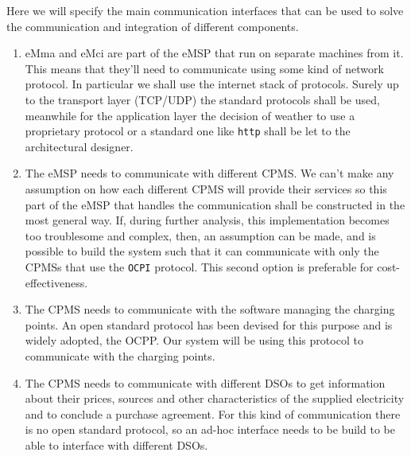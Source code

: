 Here we will specify the main communication interfaces that can be used to solve the communication and integration of different components.

\begin{enumerate}
    \item eMma and eMci are part of the eMSP that run on separate machines from it. This means that they'll need to communicate using some kind of network protocol. In particular we shall use the internet stack of protocols. Surely up to the transport layer (TCP/UDP) the standard protocols shall be used, meanwhile for the application layer the decision of  weather to use a proprietary protocol or a standard one like \verb|http| shall be let to the architectural designer.
    \item The eMSP needs to communicate with different CPMS. We can't make any assumption on how each different CPMS will provide their services so this part of the eMSP that handles the communication shall be constructed in the most general way. If, during further analysis, this implementation becomes too troublesome and complex, then, an assumption can be made, and is possible to build the system such that it can communicate with only the CPMSs that use the \verb|OCPI| protocol. This second option is preferable for cost-effectiveness.
    \item The CPMS needs to communicate with the software managing the charging points. An open standard protocol has been devised for this purpose and is widely adopted, the OCPP. Our system will be using this protocol to communicate with the charging points.
    \item The CPMS needs to communicate with different DSOs to get information about their prices, sources and other characteristics of the supplied electricity and to conclude a purchase agreement. For this kind of communication there is no open standard protocol, so an ad-hoc interface needs to be build to be able to interface with different DSOs.
\end{enumerate}
\clearpage